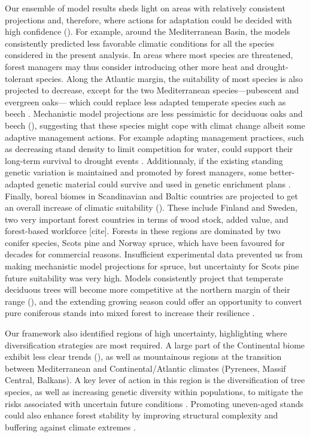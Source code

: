 \documentclass[11pt,letter]{article}
\begin{document}
Our ensemble of model results sheds light on areas with relatively consistent projections and, therefore, where actions for adaptation could be decided with high confidence (). For example, around the Mediterranean Basin, the models consistently predicted less favorable climatic conditions for all the species considered in the present analysis. In areas where most species are threatened, forest managers may thus consider introducing other more heat and drought-tolerant species. Along the Atlantic margin, the suitability of most species is also projected to decrease, except for the two Mediterranean species---pubescent and evergreen oaks--- which could replace less adapted temperate species such as beech \citep{Penuelas2003}. Mechanistic model projections are less pessimistic for deciduous oaks and beech (), suggesting that these species might cope with climat change albeit some adaptive management actions. For example adapting management practices, such as decreasing stand density to limit competition for water, could support their long-term survival to drought events \citep{Young2023}. Additionnaly, if the existing standing genetic variation is maintained and promoted by forest managers, some better-adapted genetic material could survive and used in genetic enrichment plans \citep{Brang2014}. Finally, boreal biomes in Scandinavian and Baltic countries are projected to get an overall increase of climatic suitability (). These include Finland and Sweden, two very important forest countries in terms of wood stock, added value, and forest-based workforce [cite]. Forests in these regions are dominated by two conifer species, Scots pine and Norway spruce, which have been favoured for decades for commercial reasons. Insufficient experimental data prevented us from making mechanistic model projections for spruce, but uncertainty for Scots pine future suitability was very high. Models consistently project that temperate deciduous trees will become more competitive at the northern margin of their range (), and the extending growing season could offer an opportunity to convert pure coniferous stands into mixed forest to increase their resilience \citep{Schauer2023}.

Our framework also identified regions of high uncertainty, highlighting where diversification strategies are most required.
A large part of the Continental biome exhibit less clear trends (), as well as mountainous regions at the transition between Mediterranean and Continental/Atlantic climates (Pyrenees, Massif Central, Balkans). A key lever of action in this region is the diversification of tree species, as well as increasing genetic diversity within populations, to mitigate the risks associated with uncertain future conditions \citep{Morin2014, Ammer2019, Pretzsch2021, Vospernik2024}. Promoting uneven-aged stands could also enhance forest stability by improving structural complexity and buffering against climate extremes \citep{Vangi2024, Zhang2024a}.
\end{document}
